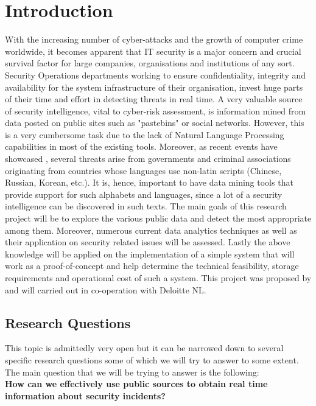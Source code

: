 \documentclass[12pt]{article}
\begin{document}
\section{Introduction}
\parbox{\linewidth}{
With the increasing number of cyber-attacks and the growth of computer crime worldwide, it becomes apparent that IT security is a major concern and crucial survival factor for large companies, organisations and institutions of any sort. Security Operations departments working to ensure confidentiality, integrity and availability for the system infrastructure of their organisation, invest huge  parts \cite{cyber} of their time and effort in detecting threats in real time. A very valuable source of security intelligence, vital to cyber-risk assessment, is information mined from data posted on public sites such as "pastebins" or social networks. However, this is a very cumbersome task due to the lack of Natural Language Processing capabilities in most of the existing tools. Moreover, as recent events have showcased \cite{sony}, several threats arise from governments and criminal associations originating from countries whose languages use non-latin scripts (Chinese, Russian, Korean, etc.). It is, hence, important to have data mining tools that provide support for such alphabets and languages, since a lot of a security intelligence can be discovered in such texts. The main goals of this research project will be to explore the various public data and detect the most appropriate among them. Moreover, numerous current data analytics techniques as well as their application on security related issues will be assessed. Lastly the above knowledge will be applied on the implementation of a simple system that will work as a proof-of-concept and help determine the technical feasibility, storage requirements and operational cost of such a system. This project was proposed by and will carried out in co-operation with Deloitte NL. 
}
\newpage
\subsection{Research Questions}
This topic is admittedly very open but it can be narrowed down to several specific research questions some of which we will try to answer to some extent. The main question that we will be trying to answer is the following:\\[0.1cm]

\noindent
\textbf{How can we effectively use public sources to obtain real time information about security incidents?}\\[0.1cm]
\end{document}
